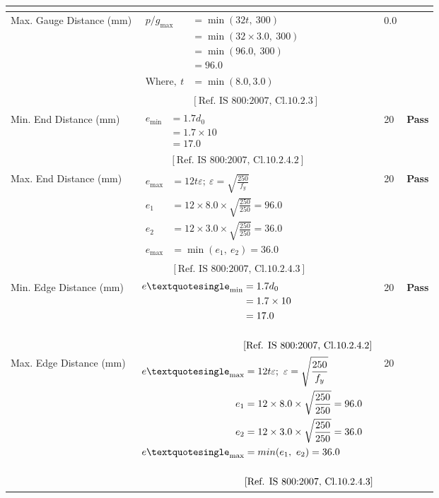 \documentclass{article}%
\begin{document}
\begin{longtable}{|p{3.5cm}|p{5.3cm}|p{6.7cm}|p{1.5cm}|}
{\textbf{}
}\\%
\hline%
Max. Gauge Distance (mm)&$\begin{aligned}p/g_{\max}&=\min(32t,~300)\\ &=\min(32\times3.0,~ 300) \\ &=\min(96.0,~ 300) \\ &=96.0 \\ \\ \text{Where},~t &= \min(8.0,3.0)\\ \\ & [\text{Ref. IS 800:2007, Cl.10.2.3}] \end{aligned}$&0.0&\textcolor{OsdagGreen}{ 
\textbf{}
}\\%
\hline%
Min. End Distance (mm)&$\begin{aligned}e_{\min} &= 1.7 d_0 \\ &= 1.7\times10\\ &=17.0\\ \\ & [\text{Ref. IS 800:2007, Cl.10.2.4.2}] \end{aligned}$&20&\textcolor{OsdagGreen}{ 
\textbf{Pass}
}\\%
\hline%
Max. End Distance (mm)&$\begin{aligned}e_{\max} &= 12 t \varepsilon ;~\varepsilon = \sqrt{\frac{250}{f_y}}\\ e_1 &= 12 \times 8.0\times \sqrt{\frac{250}{250}} = 96.0\\ e_2 &= 12 \times3.0\times\sqrt{\frac{250}{250}} = 36.0\\ e_{\max}&=\min(e_1,~e_2)=36.0 \\ \\ & [\text{Ref. IS 800:2007, Cl.10.2.4.3}] \end{aligned}$&20&\textcolor{OsdagGreen}{ 
\textbf{Pass}
}\\%
\hline%
Min. Edge Distance (mm)&$\begin{aligned}e\textquotesingle_{\min} &= 1.7 d_0 \\ &= 1.7\times10\\ &=17.0\\ \\ & [\text{Ref. IS 800:2007, Cl.10.2.4.2}] \end{aligned}$&20&\textcolor{OsdagGreen}{ 
\textbf{Pass}
}\\%
\hline%
Max. Edge Distance (mm)&$\begin{aligned}e\textquotesingle_{\max} &= 12 t \varepsilon ;~\varepsilon = \sqrt{\frac{250}{f_y}}\\ e_1 &= 12 \times 8.0\times \sqrt{\frac{250}{250}} = 96.0\\ e_2 &= 12 \times3.0\times\sqrt{\frac{250}{250}} = 36.0\\ e\textquotesingle_{\max}&=min(e_1,~e_2)=36.0 \\ \\ & [\text{Ref. IS 800:2007, Cl.10.2.4.3}] \end{aligned}$&20&\textcolor{OsdagGreen}{ 
}
\end{longtable}
\end{document}
